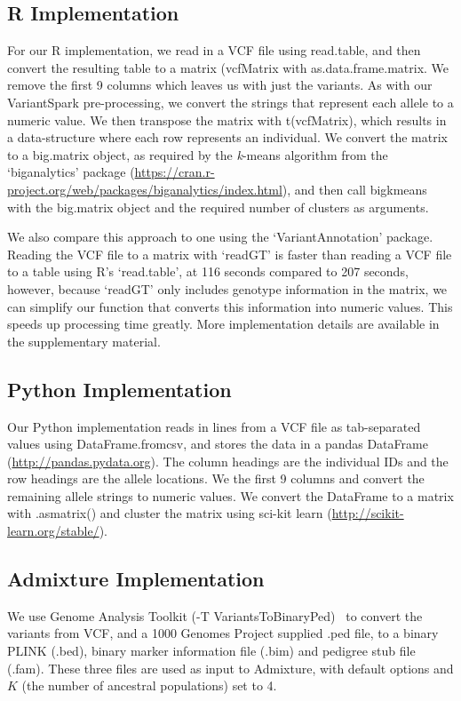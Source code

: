 \documentclass{bmcart}
\newcommand{\variantSpark}{{\sc VariantSpark}}
\newcommand{\kMeans}{\textit{k}-means}
\begin{document}
\subsection*{R Implementation}
For our R implementation, we read in a VCF file using {\sc read.table}, and then convert the resulting table to a matrix ({\sc vcfMatrix} with {\sc as.data.frame.matrix}.
We remove the first 9 columns which leaves us with just the variants. As with our \variantSpark{} pre-processing, we convert the strings that represent each allele to a numeric value.
We then transpose the matrix with {\sc t(vcfMatrix)}, which results in a data-structure where each row represents an individual. We convert the matrix to a {\sc big.matrix} object,
as required by the \kMeans{} algorithm from the `biganalytics' package (\url{https://cran.r-project.org/web/packages/biganalytics/index.html}), and then call {\sc bigkmeans} with
the {\sc big.matrix} object and the required number of clusters as arguments.

We also compare this approach to one using the `VariantAnnotation' package. Reading the VCF file to a matrix with `readGT' is faster than reading a VCF file to a table using R's `read.table', at 116 seconds compared to 207 seconds,
however, because `readGT' only includes genotype information in the matrix, we can simplify our function that converts this information into numeric values. This speeds up processing time greatly. More implementation details are available
in the supplementary material. 


\subsection*{Python Implementation}
Our Python implementation reads in lines from a VCF file as tab-separated values using {\sc DataFrame.from\textunderscore{}csv}, and stores the data in a pandas DataFrame (\url{http://pandas.pydata.org}). The column headings are the individual IDs and the row headings are the allele locations.
We the first 9 columns and convert the remaining allele strings to numeric values.
We convert the DataFrame to a matrix with {\sc .as\textunderscore{}matrix()} and cluster the matrix using sci-kit learn (\url{http://scikit-learn.org/stable/}).

\subsection*{{\sc Admixture} Implementation}
We use Genome Analysis Toolkit ({\sc -T VariantsToBinaryPed})~\cite{McKenna2010} to convert the variants from VCF, and a 1000 Genomes Project supplied .ped file, to a binary PLINK (.bed), binary marker information file (.bim) and pedigree stub file (.fam).
These three files are used as input to {\sc Admixture}, with default options and $K$ (the number of ancestral populations) set to 4.
\end{document}
